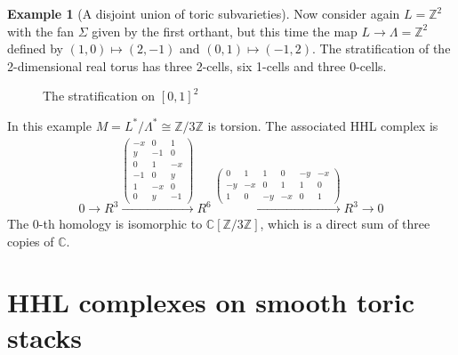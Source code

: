 \documentclass[11pt,reqno]{amsart}
\def\C {{\mathbb C}}
\def\Z {{\mathbb Z}}
\theoremstyle{definition}
\newtheorem{example}[theorem]{Example}
\numberwithin{equation}{section}
\begin{document}
\begin{example}[A disjoint union of toric subvarieties]\label{eg-torsion}
Now consider again $L = \Z^2$ with the fan $\Sigma$ given by the first orthant, but this time the map $L\rightarrow\Lambda = \Z^2$ defined by $(1,0)\mapsto (2,-1)$ and $(0,1)\mapsto (-1,2)$. The stratification of the 2-dimensional real torus has three 2-cells, six 1-cells and three 0-cells.

\begin{figure}[H]
    \centering
\caption{The stratification on $[0,1]^2$}
\end{figure}

In this example $M=L^*/\Lambda^*\cong \Z/3\Z$ is torsion. The associated HHL complex is
\begin{align}\label{eq-torsion}
    0\rightarrow 
        R^3\xrightarrow{\begin{pmatrix} -x & 0 & 1 \\ y & -1 & 0 \\ 0 & 1 & -x \\ -1 & 0 & y \\ 1 & -x & 0 \\ 0 & y & -1 \end{pmatrix}} R^6 \xrightarrow{\begin{pmatrix} 0 & 1 & 1 & 0 & -y & -x \\ -y & -x & 0 & 1 & 1 & 0 \\ 1 & 0 & -y & -x & 0 & 1 \end{pmatrix}} R^3 \rightarrow 0 
\end{align}
The $0$-th homology is isomorphic to $\C[\Z/3\Z]$, which is a direct sum of three copies of $\C$.

\end{example}




\section{HHL complexes on smooth toric stacks}\label{sec-general-HHL}
\end{document}

